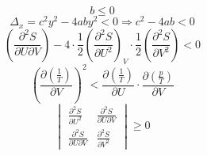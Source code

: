 \documentclass{article}
\begin{document}
		\begin{equation}
		b \leqslant 0
		\end{equation}
		\begin{equation}
		\Delta_x = c^2y^2 - 4aby^2 < 0 \Rightarrow c^2 - 4ab < 0
		\end{equation}
		\begin{equation}
		(\frac{\partial ^ 2S}{\partial U \partial V}) -
		4 \cdot \frac{1}{2} (\frac{\partial ^ 2S}{\partial U^2})_V \cdot
		 \frac{1}{2} (\frac{\partial ^ 2S}{\partial V^2}) < 0
		\end{equation}
		\begin{equation}
		(\frac{\partial (\frac{1}{T})}{\partial V})^2 < 
		\frac{\partial (\frac{1}{T})}{\partial U} \cdot
		\frac{\partial (\frac{p}{T})}{\partial V} 
		\end{equation}
		\begin{equation}
		\begin{vmatrix}
			\frac{\partial ^ 2S}{\partial U^2} & \frac{\partial ^ 2S}{\partial U \partial V} \\
			\frac{\partial ^ 2S}{\partial U \partial V} & \frac{\partial ^ 2S}{\partial V^2}
		\end{vmatrix}
		\geqslant 0
		\end{equation}
\end{document}
